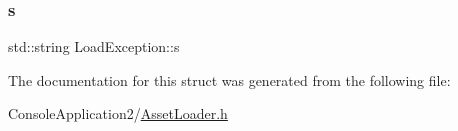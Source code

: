\subsubsection{\texorpdfstring{s}{s}}
{\footnotesize\ttfamily std\+::string Load\+Exception\+::s}



The documentation for this struct was generated from the following file\+:\begin{DoxyCompactItemize}
\item 
Console\+Application2/\hyperlink{_asset_loader_8h}{Asset\+Loader.\+h}\end{DoxyCompactItemize}
